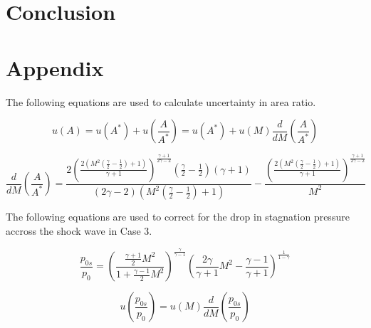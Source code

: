 \documentclass{article}
\begin{document}
\section{Conclusion}

\newpage

\section{Appendix}

The following equations are used to calculate uncertainty in area ratio.

\begin{equation}
    u(A) = u(A^*) + u\left( \frac{A}{A^*} \right) = u(A^*) + u(M) \frac{d}{dM}\left( \frac{A}{A^*} \right)
\end{equation}

\begin{equation}
    \frac{d}{dM}\left( \frac{A}{A^*} \right) = \frac{2 \left(\frac{2 \left(M^{2} \left(\frac{\gamma}{2} - \frac{1}{2}\right) + 1\right)}{\gamma + 1}\right)^{\frac{\gamma + 1}{2 \gamma - 2}} \left(\frac{\gamma}{2} - \frac{1}{2}\right) \left(\gamma + 1\right)}{\left(2 \gamma - 2\right) \left(M^{2} \left(\frac{\gamma}{2} - \frac{1}{2}\right) + 1\right)} - \frac{\left(\frac{2 \left(M^{2} \left(\frac{\gamma}{2} - \frac{1}{2}\right) + 1\right)}{\gamma + 1}\right)^{\frac{\gamma + 1}{2 \gamma - 2}}}{M^{2}}
    \label{eqn:dA_dM}
\end{equation}

The following equations are used to correct for the drop in stagnation pressure accross the shock wave in Case 3.

\begin{equation}
    \frac{p_{0s}}{p_0} = \left( \frac{\frac{\gamma+1}{2}M^2}{1 + \frac{\gamma-1}{2}M^2}\right) ^ \frac{\gamma}{\gamma-1} \left( \frac{2\gamma}{\gamma+1} M^2 - \frac{\gamma-1}{\gamma+1}\right) ^ \frac{1}{1 - \gamma}
\end{equation}

\begin{equation}
    u\left( \frac{p_{0s}}{p_0} \right) = u(M) \frac{d}{dM}\left( \frac{p_{0s}}{p_0} \right)
\end{equation}
\end{document}
